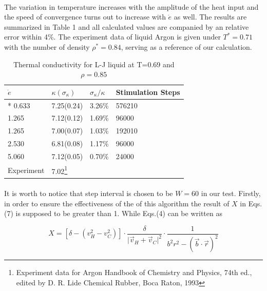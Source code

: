 \documentclass[twocolumn]{article}
\begin{document}
\paragraph*{}
The variation in temperature increases with the amplitude of the heat input and the speed of convergence turns out to increase with $\dot{e}$ as well. The results are summarized in Table 1 and all calculated values are companied by an relative error within 4\%. The experiment data of liquid Argon is given under $T^*=0.71$ with the number of density $\rho^*=0.84$, serving as a reference of our calculation.   
\begin{table}[ht]
\centering
\caption{Thermal conductivity for L-J liquid at T=0.69 and $\rho=0.85$}

\begin{tabular}{p{1.6cm}|p{1.7cm} p{1.7cm} p{1.7cm}}
\hline
\hline
{$\dot{e}$}&{$\kappa(\sigma_\kappa)$ }&{$\sigma_\kappa/\kappa$}&{Stimulation Steps}\\
\hline*
0.633                              &   7.25(0.24)   & 3.26\%         & 576210\\
1.265                              &   7.12(0.12)   & 1.69\%         & 96000\\
1.265                              &   7.00(0.07)   & 1.03\%         & 192010\\
2.530                              &   6.81(0.08)   & 1.17\%         & 96000\\
5.060                              &   7.12(0.05)   & 0.70\%        & 24000\\
\hline
Experiment                         &   7.02\footnote{Experiment data for Argon    Handbook of Chemistry and Physics, 74th ed., edited by D. R. Lide Chemical Rubber, Boca Raton, 1993} \\
\hline
\end{tabular}
\end{table}
\paragraph*{}
It is worth to notice that step interval is chosen to be $W=60$ in our test. Firstly, in order to ensure the effectiveness of the of this algorithm the result of $X$ in Eqs.(7) is supposed to be greater than 1. While Eqs.(4) can be written as

\begin{equation}
X = [\delta-(v_H^2-v_C^2)]\cdot\frac{\delta}{\lvert \vec{v}_H+\vec{v}_C\lvert^2}\cdot\frac{1}{b^2r^2-(\vec{b}\cdot\vec{r})^2}
\end{equation}
\end{document}

